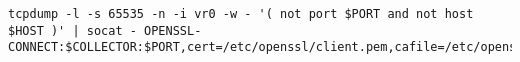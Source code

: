 \begin{lstlisting}
tcpdump -l -s 65535 -n -i vr0 -w - '( not port $PORT and not host $HOST )' | socat - OPENSSL-CONNECT:$COLLECTOR:$PORT,cert=/etc/openssl/client.pem,cafile=/etc/openssl/ca.crt,verify=1
\end{lstlisting}

